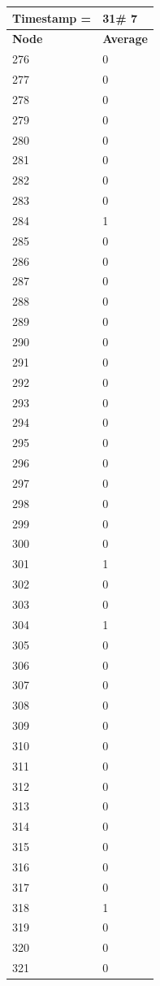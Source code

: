 \begin{tabular}{|l||l|}
\hline
\textbf{Timestamp =} & \textbf{31}\# 7\\\hline
	\textbf{Node} & \textbf{Average} \\ \hline
\hline
	276 & 0 \\ \hline
	277 & 0 \\ \hline
	278 & 0 \\ \hline
	279 & 0 \\ \hline
	280 & 0 \\ \hline
	281 & 0 \\ \hline
	282 & 0 \\ \hline
	283 & 0 \\ \hline
	284 & 1 \\ \hline
	285 & 0 \\ \hline
	286 & 0 \\ \hline
	287 & 0 \\ \hline
	288 & 0 \\ \hline
	289 & 0 \\ \hline
	290 & 0 \\ \hline
	291 & 0 \\ \hline
	292 & 0 \\ \hline
	293 & 0 \\ \hline
	294 & 0 \\ \hline
	295 & 0 \\ \hline
	296 & 0 \\ \hline
	297 & 0 \\ \hline
	298 & 0 \\ \hline
	299 & 0 \\ \hline
	300 & 0 \\ \hline
	301 & 1 \\ \hline
	302 & 0 \\ \hline
	303 & 0 \\ \hline
	304 & 1 \\ \hline
	305 & 0 \\ \hline
	306 & 0 \\ \hline
	307 & 0 \\ \hline
	308 & 0 \\ \hline
	309 & 0 \\ \hline
	310 & 0 \\ \hline
	311 & 0 \\ \hline
	312 & 0 \\ \hline
	313 & 0 \\ \hline
	314 & 0 \\ \hline
	315 & 0 \\ \hline
	316 & 0 \\ \hline
	317 & 0 \\ \hline
	318 & 1 \\ \hline
	319 & 0 \\ \hline
	320 & 0 \\ \hline
	321 & 0 \\ \hline
\end{tabular}
